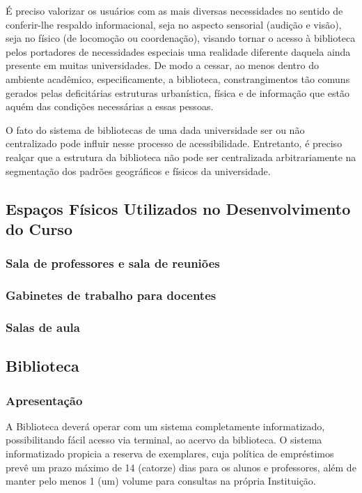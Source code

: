 	É preciso valorizar os usuários com as mais diversas necessidades no sentido de conferir-lhe respaldo informacional, seja no aspecto sensorial (audição e visão), seja no físico (de locomoção ou coordenação), visando tornar o acesso à biblioteca pelos portadores de necessidades especiais uma realidade diferente daquela ainda presente em muitas universidades. De modo a cessar, ao menos dentro do ambiente acadêmico, especificamente, a biblioteca, constrangimentos tão comuns gerados pelas deficitárias estruturas urbanística, física e de informação que estão aquém das condições necessárias a essas pessoas.
	
	O fato do sistema de bibliotecas de uma dada universidade ser ou não centralizado pode influir nesse processo de acessibilidade. Entretanto, é preciso realçar que a estrutura da biblioteca não pode ser centralizada arbitrariamente na segmentação dos padrões geográficos e físicos da universidade.


\subsection{Espa\c{c}os F\'isicos Utilizados no Desenvolvimento do Curso}

\subsubsection{Sala de professores e sala de reuni\~oes}

\subsubsection{Gabinetes de trabalho para docentes}

\subsubsection{Salas de aula}


\subsection{Biblioteca}

\subsubsection{Apresenta\c{c}\~ao}

A Biblioteca deverá operar com um sistema completamente informatizado, possibilitando fácil acesso via terminal, ao acervo da biblioteca. O sistema informatizado propicia a reserva de exemplares, cuja política de empréstimos prevê um prazo máximo de 14 (catorze) dias para os alunos e professores, além de manter pelo menos 1 (um) volume para consultas na própria Instituição.

